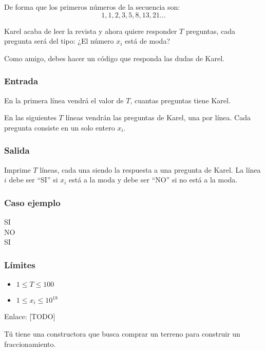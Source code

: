 De forma que los primeros números de la secuencia son:
 \[1,1,2,3,5,8,13,21\ldots\]

Karel acaba de leer la revista y ahora quiere responder \(T\) preguntas, cada pregunta será del tipo: ¿El número \(x_i\) está de moda?

Como amigo, debes hacer un código que responda las dudas de Karel.

\subsubsection*{Entrada}
En la primera línea vendrá el valor de \(T\), cuantas preguntas tiene Karel.

En las siguientes \(T\) líneas vendrán las preguntas de Karel, una por línea. Cada pregunta consiste en un solo entero \(x_i\).

\subsubsection*{Salida}
Imprime \(T\) líneas, cada una siendo la respuesta a una pregunta de Karel. La línea \(i\) debe ser “SI” si \(x_i\) está a la moda y debe ser “NO” si no está a la moda. 

\subsubsection*{Caso ejemplo}	

\begin{casebox2}
	{
		SI\\
		NO\\
		SI
	}
\end{casebox2}

\subsubsection*{Límites}

\begin{itemize}
	\setlength{\parskip}{1pt}	
	\item \(1\leq T \leq 100\)
	\item \(1\leq x_i \leq 10^{18}\)
\end{itemize}

Enlace: [TODO]

\problembreak

\problemtitle Tú tiene una constructora que busca comprar un terreno para construir un fraccionamiento.

